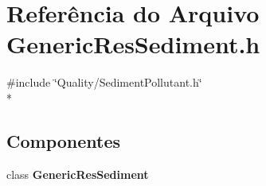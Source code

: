 \section{Referência do Arquivo Generic\+Res\+Sediment.\+h}
\label{_generic_res_sediment_8h}
{\ttfamily \#include \char`\"{}Quality/\+Sediment\+Pollutant.\+h\char`\"{}}\\*
\subsection*{Componentes}
\begin{DoxyCompactItemize}
\item 
class {\bf Generic\+Res\+Sediment}
\end{DoxyCompactItemize}
